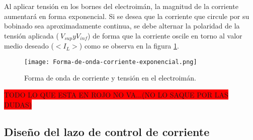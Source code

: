 Al aplicar tensión en los bornes del electroimán, la magnitud de la corriente aumentará en forma exponencial. Si se desea que la corriente que circule por su bobinado sea aproximadamente continua, se debe alternar la polaridad de la tensión aplicada ($\ V_{sup} y V_{inf}$) de forma que la corriente oscile en torno al valor medio deseado ($<I_L>$) como se observa en la figura \ref{fig:img_corriente_exponencial}.

\begin{figure}[H]
	\centering
	\texttt{[image: Forma-de-onda-corriente-exponencial.png]}
	\caption{Forma de onda de corriente y tensión en el electroimán.}
	\label{fig:img_corriente_exponencial}
\end{figure}



\colorbox{red}{TODO LO QUE ESTA EN ROJO NO VA...(NO LO SAQUE POR LAS DUDAS)}




\subsection{Diseño del lazo de control de corriente}


